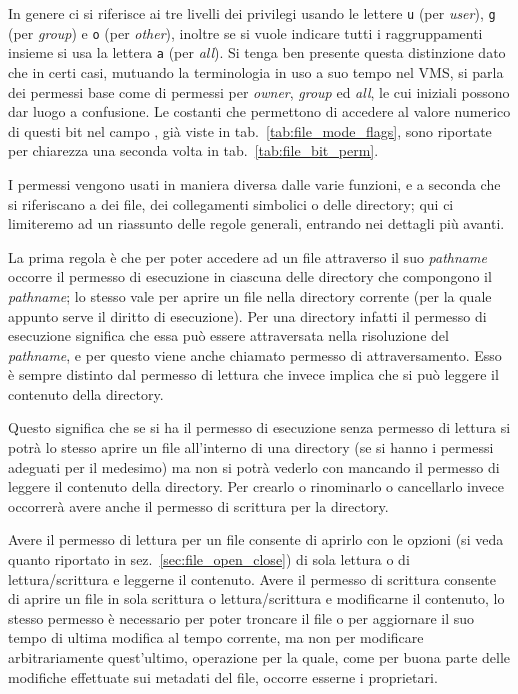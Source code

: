 In genere ci si riferisce ai tre livelli dei privilegi usando le lettere
\texttt{u} (per \textit{user}), \texttt{g} (per \textit{group}) e \texttt{o}
(per \textit{other}), inoltre se si vuole indicare tutti i raggruppamenti
insieme si usa la lettera \texttt{a} (per \textit{all}). Si tenga ben presente
questa distinzione dato che in certi casi, mutuando la terminologia in uso a
suo tempo nel VMS, si parla dei permessi base come di permessi per
\textit{owner}, \textit{group} ed \textit{all}, le cui iniziali possono dar
luogo a confusione.  Le costanti che permettono di accedere al valore numerico
di questi bit nel campo , già viste in
tab.~\ref{tab:file_mode_flags}, sono riportate per chiarezza una seconda volta
in tab.~\ref{tab:file_bit_perm}.

I permessi vengono usati in maniera diversa dalle varie funzioni, e a seconda
che si riferiscano a dei file, dei collegamenti simbolici o delle directory;
qui ci limiteremo ad un riassunto delle regole generali, entrando nei dettagli
più avanti.

La prima regola è che per poter accedere ad un file attraverso il suo
\textit{pathname} occorre il permesso di esecuzione in ciascuna delle
directory che compongono il \textit{pathname}; lo stesso vale per aprire un
file nella directory corrente (per la quale appunto serve il diritto di
esecuzione). Per una directory infatti il permesso di esecuzione significa che
essa può essere attraversata nella risoluzione del \textit{pathname}, e per
questo viene anche chiamato permesso di attraversamento. Esso è sempre
distinto dal permesso di lettura che invece implica che si può leggere il
contenuto della directory.

Questo significa che se si ha il permesso di esecuzione senza permesso di
lettura si potrà lo stesso aprire un file all'interno di una directory (se si
hanno i permessi adeguati per il medesimo) ma non si potrà vederlo con
 mancando il permesso di leggere il contenuto della directory. Per
crearlo o rinominarlo o cancellarlo invece occorrerà avere anche il permesso
di scrittura per la directory.

Avere il permesso di lettura per un file consente di aprirlo con le opzioni
(si veda quanto riportato in sez.~\ref{sec:file_open_close}) di sola lettura o
di lettura/scrittura e leggerne il contenuto. Avere il permesso di scrittura
consente di aprire un file in sola scrittura o lettura/scrittura e modificarne
il contenuto, lo stesso permesso è necessario per poter troncare il file o per
aggiornare il suo tempo di ultima modifica al tempo corrente, ma non per
modificare arbitrariamente quest'ultimo, operazione per la quale, come per
buona parte delle modifiche effettuate sui metadati del file, occorre esserne
i proprietari.

